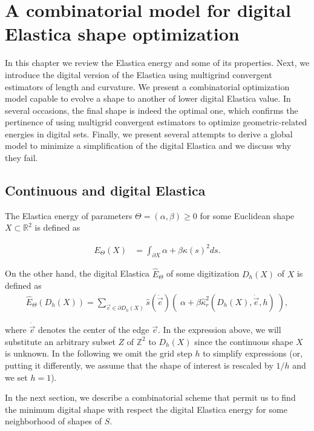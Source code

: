 \chapter{A combinatorial model for digital Elastica shape optimization}
\label{chapter:digital-elastica}

In this chapter we review the Elastica energy and some of its properties. Next, we introduce the digital version of the Elastica using multigrind convergent estimators of length and curvature. We present a combinatorial optimization model capable to evolve a shape to another of lower digital Elastica value. In several occasions, the final shape is indeed the optimal one, which confirms the pertinence of using multigrid convergent estimators to optimize geometric-related energies in digital sets. Finally, we present several attempts to derive a global model to minimize a simplification of the digital Elastica and we discuss why they fail.

\section{Continuous and digital Elastica}
\label{ch6:sec:continuous-digital-elastica}

	The Elastica energy of parameters $\Theta=(\alpha, \beta) \geq 0$ for some Euclidean shape $X \subset \mathbb{R}^2$ is defined as
	
	\begin{align*}
	E_{\Theta}(X) &= \int_{\partial X}{ \alpha + \beta \kappa(s)^2 ds}.
	\end{align*}
	
	
On the other hand, the digital Elastica $\hat{E}_{\Theta}$ of some digitization $D_h(X)$ of $X$ is defined as
	\begin{align}
	\hat{E}_{\Theta}( D_h(X) ) = \sum_{\dot{\vec{e}} \in \partial D_h(X)}{ \hat{s}( \dot{\vec{e}})\left(\; \alpha + \beta \hat{\kappa}_{r}^2(D_h(X),\dot{\vec{e}},h) \; \right)},
	\label{eq:digital-elastica}
	\end{align}
	
where $\dot{\vec{e}}$ denotes the center of the edge $\vec{e}$. In the
expression above, we will substitute an arbitrary subset $Z$ of
$\mathbb{Z}^2$ to $D_h(X)$ since the continuous shape $X$ is unknown.
In the following we omit the grid step $h$ to simplify expressions
(or, putting it differently, we assume that the shape of interest is
rescaled by $1/h$ and we set $h=1$). 

In the next section, we describe a combinatorial scheme that permit us to find the minimum digital shape with respect the digital Elastica energy for some neighborhood of shapes of $S$. 

